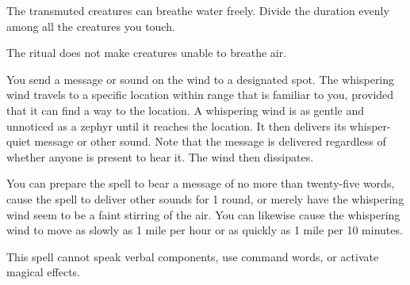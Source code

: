 \begin{spelleffect}
The transmuted creatures can breathe water freely. Divide the duration evenly among all the creatures you touch.
\end{spelleffect}
\begin{spellnotes}
The ritual does not make creatures unable to breathe air.
\end{spellnotes}

\begin{spelleffect}
You send a message or sound on the wind to a designated spot. The whispering wind travels to a specific location within range that is familiar to you, provided that it can find a way to the location. A whispering wind is as gentle and unnoticed as a zephyr until it reaches the location. It then delivers its whisper-quiet message or other sound. Note that the message is delivered regardless of whether anyone is present to hear it. The wind then dissipates.
\par You can prepare the spell to bear a message of no more than twenty-five words, cause the spell to deliver other sounds for 1 round, or merely have the whispering wind seem to be a faint stirring of the air. You can likewise cause the whispering wind to move as slowly as 1 mile per hour or as quickly as 1 mile per 10 minutes.
\end{spelleffect}
\begin{spellnotes}
This spell cannot speak verbal components, use command words, or activate magical effects.
\end{spellnotes}

